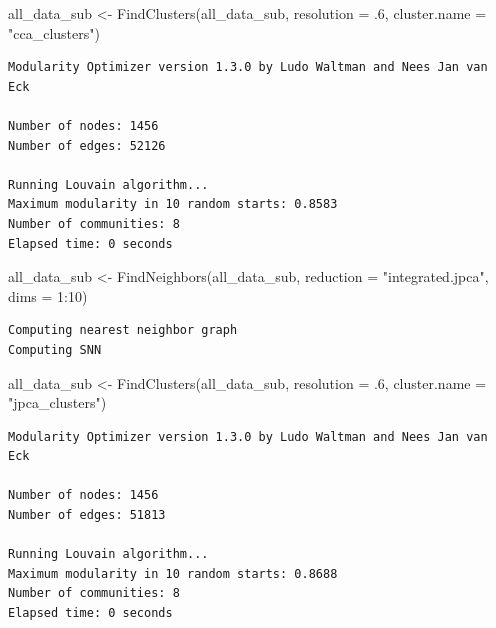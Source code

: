 \documentclass[
  letterpaper,
  DIV=11,
  numbers=noendperiod]{scrreprt}
\newenvironment{Shaded}{\begin{snugshade}}{\end{snugshade}}
\newcommand{\AttributeTok}[1]{\textcolor[rgb]{0.40,0.45,0.13}{#1}}
\newcommand{\DecValTok}[1]{\textcolor[rgb]{0.68,0.00,0.00}{#1}}
\newcommand{\FunctionTok}[1]{\textcolor[rgb]{0.28,0.35,0.67}{#1}}
\newcommand{\NormalTok}[1]{\textcolor[rgb]{0.00,0.23,0.31}{#1}}
\newcommand{\OtherTok}[1]{\textcolor[rgb]{0.00,0.23,0.31}{#1}}
\newcommand{\SpecialCharTok}[1]{\textcolor[rgb]{0.37,0.37,0.37}{#1}}
\newcommand{\StringTok}[1]{\textcolor[rgb]{0.13,0.47,0.30}{#1}}
\begin{document}
\begin{Shaded}
\begin{Highlighting}[]
\NormalTok{all\_data\_sub }\OtherTok{\textless{}{-}} \FunctionTok{FindClusters}\NormalTok{(all\_data\_sub, }\AttributeTok{resolution =}\NormalTok{ .}\DecValTok{6}\NormalTok{, }\AttributeTok{cluster.name =} \StringTok{"cca\_clusters"}\NormalTok{)}
\end{Highlighting}
\end{Shaded}

\begin{verbatim}
Modularity Optimizer version 1.3.0 by Ludo Waltman and Nees Jan van Eck

Number of nodes: 1456
Number of edges: 52126

Running Louvain algorithm...
Maximum modularity in 10 random starts: 0.8583
Number of communities: 8
Elapsed time: 0 seconds
\end{verbatim}

\begin{Shaded}
\begin{Highlighting}[]
\NormalTok{all\_data\_sub }\OtherTok{\textless{}{-}} \FunctionTok{FindNeighbors}\NormalTok{(all\_data\_sub, }\AttributeTok{reduction =} \StringTok{"integrated.jpca"}\NormalTok{, }\AttributeTok{dims =} \DecValTok{1}\SpecialCharTok{:}\DecValTok{10}\NormalTok{)}
\end{Highlighting}
\end{Shaded}

\begin{verbatim}
Computing nearest neighbor graph
Computing SNN
\end{verbatim}

\begin{Shaded}
\begin{Highlighting}[]
\NormalTok{all\_data\_sub }\OtherTok{\textless{}{-}} \FunctionTok{FindClusters}\NormalTok{(all\_data\_sub, }\AttributeTok{resolution =}\NormalTok{ .}\DecValTok{6}\NormalTok{, }\AttributeTok{cluster.name =} \StringTok{"jpca\_clusters"}\NormalTok{)}
\end{Highlighting}
\end{Shaded}

\begin{verbatim}
Modularity Optimizer version 1.3.0 by Ludo Waltman and Nees Jan van Eck

Number of nodes: 1456
Number of edges: 51813

Running Louvain algorithm...
Maximum modularity in 10 random starts: 0.8688
Number of communities: 8
Elapsed time: 0 seconds
\end{verbatim}
\end{document}
